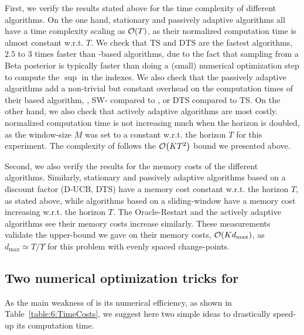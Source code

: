 First, we verify the results stated above for the time complexity of different algorithms.
On the one hand, stationary and passively adaptive algorithms all have a time complexity scaling as $\mathop{}\mathopen{}\mathcal{O}\mathopen{}\left(T\right)$, as their normalized computation time is almost constant w.r.t. $T$.
We check that TS and DTS are the fastest algorithms, $2.5$ to $3$ times faster than \klUCB-based algorithms, due to the fact that sampling from a Beta posterior is typically faster than doing a (small) numerical optimization step to compute the $\sup$ in the \klUCB{} indexes.
We also check that the passively adaptive algorithms add a non-trivial but constant overhead on the computation times of their based algorithm, \eg, SW-\klUCB{} compared to \klUCB, or DTS compared to TS.
On the other hand, we also check that actively adaptive algorithms are most costly.
\MklUCB{} normalized computation time is not increasing much when the horizon is doubled, as the window-size $M$ was set to a constant w.r.t. the horizon $T$ for this experiment.
The complexity of \GLRklUCB{} follows the $\mathop{}\mathopen{}\mathcal{O}\mathopen{}\left(K T^2\right)$ bound we presented above.

Second, we also verify the results for the memory costs of the different algorithms.
Similarly, stationary and passively adaptive algorithms based on a discount factor (D-UCB, DTS) have a memory cost constant w.r.t. the horizon $T$, as stated above,
while algorithms based on a sliding-window have a memory cost increasing w.r.t. the horizon $T$.
The Oracle-Restart and the actively adaptive algorithms see their memory costs increase similarly.
These measurements validate the upper-bound we gave on their memory costs, $\mathop{}\mathopen{}\mathcal{O}\mathopen{}\left(K d_{\max}\right)$, as $d_{\max} \simeq T / \Upsilon$ for this problem with evenly spaced change-points.


\subsection{Two numerical optimization tricks for \GLRklUCB}\label{sub:6:IdeasOptimizations}

As the main weakness of \GLRklUCB{} is its numerical efficiency, as shown in Table~\ref{table:6:TimeCosts},
we suggest here two simple ideas to drastically speed-up its computation time.

